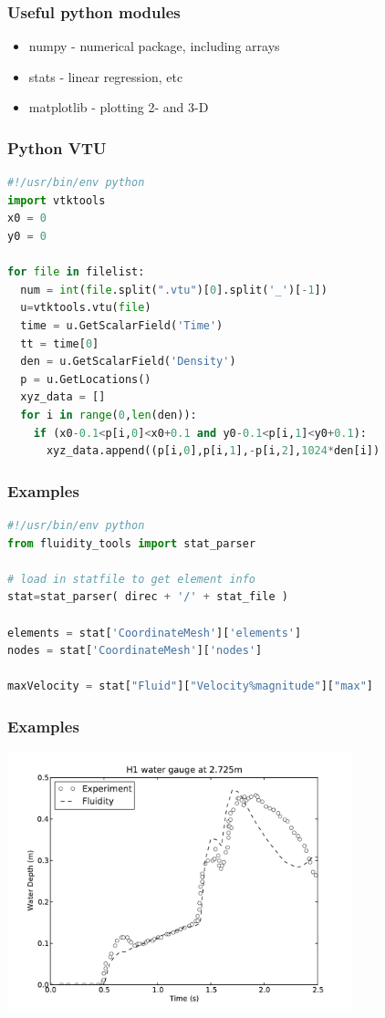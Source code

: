\documentclass[12pt]{beamer}
\begin{document}
\begin{frame}
    \frametitle{Useful python modules}
\begin{itemize}
\item numpy - numerical package, including arrays
\item stats - linear regression, etc
\item matplotlib - plotting 2- and 3-D
\end{itemize}
\end{frame}

\begin{frame}[fragile]
	\frametitle{Python VTU}
\begin{lstlisting}[language=python]
#!/usr/bin/env python
import vtktools
x0 = 0
y0 = 0

for file in filelist:
  num = int(file.split(".vtu")[0].split('_')[-1])
  u=vtktools.vtu(file)
  time = u.GetScalarField('Time')
  tt = time[0]
  den = u.GetScalarField('Density')
  p = u.GetLocations()
  xyz_data = []
  for i in range(0,len(den)):
    if (x0-0.1<p[i,0]<x0+0.1 and y0-0.1<p[i,1]<y0+0.1):
      xyz_data.append((p[i,0],p[i,1],-p[i,2],1024*den[i])
\end{lstlisting}
\end{frame}
\begin{frame}[fragile]
	\frametitle{Examples}
\begin{lstlisting}[language=python]
#!/usr/bin/env python
from fluidity_tools import stat_parser

# load in statfile to get element info
stat=stat_parser( direc + '/' + stat_file )

elements = stat['CoordinateMesh']['elements']
nodes = stat['CoordinateMesh']['nodes']

maxVelocity = stat["Fluid"]["Velocity%magnitude"]["max"]
\end{lstlisting}
\end{frame}

\begin{frame}
	\frametitle{Examples}
\includegraphics[width=0.75\textwidth]{images/water_gauge_H1.pdf}
\end{frame}
\end{document}
